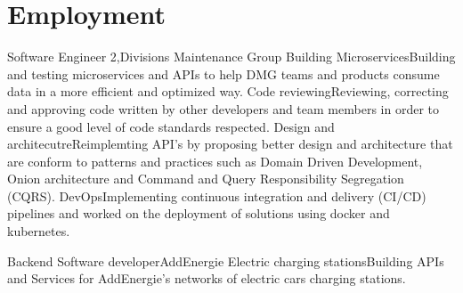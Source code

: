 \section{Employment}
  \resumeSubHeadingListStart
    \resumeSubheading
    {Software Engineer 2,}{Divisions Maintenance Group}{}
    {}
      \resumeItemListStart
        \renewcommand{\labelitemii}{\raisebox{.2cm}{$\bullet$}}
        \resumeItem
        {Building Microservices}{Building and testing microservices and APIs to help DMG teams and products consume data in a more efficient and optimized way.}
        \resumeItem
        {Code reviewing}{Reviewing, correcting and approving code written by other developers and team members in order to ensure a good level of code standards respected.}
        \renewcommand{\labelitemii}{\raisebox{.4cm}{$\bullet$}}
        \resumeItem
        {Design and architecutre}{Reimplemting API's by proposing better design and architecture that are conform to patterns and practices such as Domain Driven Development, Onion architecture and Command and Query Responsibility Segregation (CQRS).}
        \renewcommand{\labelitemii}{\raisebox{.2cm}{$\bullet$}}
        \resumeItem
        {DevOps}{Implementing continuous integration and delivery (CI/CD) pipelines and worked on the deployment of solutions using 
        docker and kubernetes.}
        \renewcommand{\labelitemii}{\scriptsize \raisebox{.25cm}{\ding{118}}}
      \resumeItemListEnd

    \resumeSubheading
    {Backend Software developer}{AddEnergie}{}
    {}
      \resumeItemListStart
      \renewcommand{\labelitemii}{\raisebox{.2cm}{$\bullet$}}
        \resumeItem
        {Electric charging stations}{Building APIs and Services for AddEnergie's networks of electric cars charging stations.}
        \renewcommand{\labelitemii}{\scriptsize \raisebox{.25cm}{\ding{118}}}
      \resumeItemListEnd

